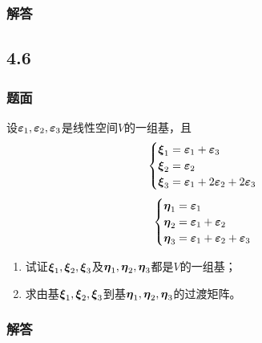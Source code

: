 \documentclass{beamer}
\begin{document}
\begin{frame}
    \frametitle{解答}



\end{frame}

\subsection*{4.6}
\begin{frame}
    \frametitle{题面}

    设\(\boldsymbol{\varepsilon}_1,\boldsymbol{\varepsilon}_2,\boldsymbol{\varepsilon}_3\)是线性空间\(V\)的一组基，且
    \begin{equation*}
        \begin{cases}
            \boldsymbol{\xi}_1=\boldsymbol{\varepsilon}_1+\boldsymbol{\varepsilon}_3 \\
            \boldsymbol{\xi}_2=\boldsymbol{\varepsilon}_2            \\
            \boldsymbol{\xi}_3=\boldsymbol{\varepsilon}_1+2\boldsymbol{\varepsilon}_2+2\boldsymbol{\varepsilon}_3
        \end{cases}
    \end{equation*}
    \begin{equation*}
        \begin{cases}
            \boldsymbol{\eta}_1=\boldsymbol{\varepsilon}_1            \\
            \boldsymbol{\eta}_2=\boldsymbol{\varepsilon}_1+\boldsymbol{\varepsilon}_2 \\
            \boldsymbol{\eta}_3=\boldsymbol{\varepsilon}_1+\boldsymbol{\varepsilon}_2+\boldsymbol{\varepsilon}_3
        \end{cases}
    \end{equation*}
    \begin{enumerate}
        \item 试证\(\boldsymbol{\xi}_1,\boldsymbol{\xi}_2,\boldsymbol{\xi}_3\)及\(\boldsymbol{\eta}_1,\boldsymbol{\eta}_2,\boldsymbol{\eta}_3\)都是\(V\)的一组基；
        \item 求由基\(\boldsymbol{\xi}_1,\boldsymbol{\xi}_2,\boldsymbol{\xi}_3\)到基\(\boldsymbol{\eta}_1,\boldsymbol{\eta}_2,\boldsymbol{\eta}_3\)的过渡矩阵。
    \end{enumerate}

\end{frame}

\begin{frame}
    \frametitle{解答}



\end{frame}
\end{document}
